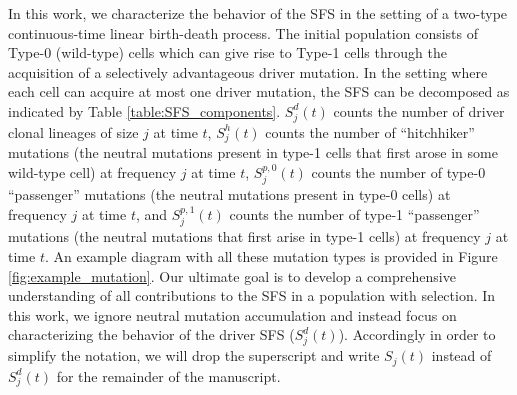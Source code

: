 \documentclass{article}
\numberwithin{equation}{section}
\begin{document}
In this work, we characterize the behavior of the SFS in the setting of a two-type continuous-time linear birth-death process. The initial population consists of Type-0 (wild-type) cells which can give rise to Type-1 cells through the acquisition of a selectively advantageous driver mutation.  In the setting where each cell can acquire at most one driver mutation, the SFS can be decomposed as indicated by Table \ref{table:SFS_components}. $S_j^d(t)$ counts the number of driver clonal lineages of size $j$ at time $t$, $S_j^h(t)$ counts the number of ``hitchhiker'' mutations (the neutral mutations present in type-1 cells that first arose in some wild-type cell) at frequency $j$ at time $t$, $S_j^{p,0}(t)$ counts the number of type-0 ``passenger'' mutations (the neutral mutations present in type-0 cells) at frequency $j$ at time $t$, and $S_j^{p,1}(t)$ counts the number of type-1 ``passenger'' mutations (the neutral mutations that first arise in type-1 cells) at frequency $j$ at time $t$. An example diagram with all these mutation types is provided in Figure \ref{fig:example_mutation}. Our ultimate goal is to develop a comprehensive understanding of all contributions to the SFS in a population with selection. In this work, we ignore neutral mutation accumulation and instead focus on characterizing the behavior of the driver SFS ($S^d_j(t)$). Accordingly in order to simplify the notation, we will drop the superscript and write $S_j(t)$ instead of $S_j^d(t)$ for the remainder of the manuscript.
\end{document}
